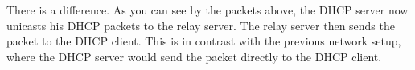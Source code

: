 There is a difference. As you can see by the packets above, the DHCP server now unicasts his DHCP packets to the relay server. The relay server then sends the packet to the DHCP client. This is in contrast with the previous network setup, where the DHCP server would send the packet directly to the DHCP client.
